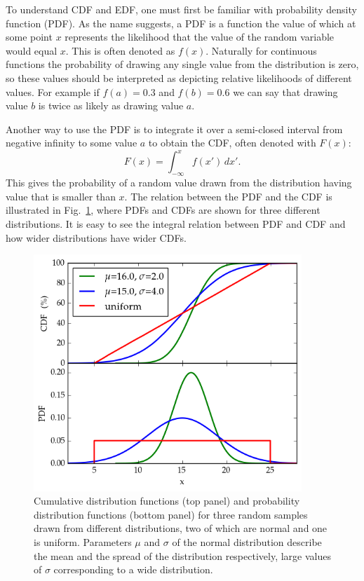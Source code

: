 \documentclass[english, oneside]{HYgradu}
\begin{document}
To understand CDF and EDF, one must first be familiar with probability density function (PDF).
As the name suggests, a PDF is a function the value of which at some point $x$ represents the likelihood that the value of the random variable would equal $x$. This is often denoted as $f(x)$. Naturally for continuous functions the probability of drawing any single value from the distribution is zero, so these values should be interpreted as depicting relative likelihoods of different values. For example if $f(a)=0.3$ and $f(b)=0.6$ we can say that drawing value $b$ is twice as likely as drawing value $a$. \citep{htk}

Another way to use the PDF is to integrate it over a semi-closed interval from negative infinity to some value $a$ to obtain the CDF, often denoted with $F(x)$:
\begin{equation}
	F(x) = \int_{-\infty}^x f(x') \,dx'.
\end{equation}	
This gives the probability of a random value drawn from the distribution having value that is smaller than $x$. The relation between the PDF and the CDF is illustrated in Fig.\ \ref{fig:cdf}, where PDFs and CDFs are shown for three different distributions. It is easy to see the integral relation between PDF and CDF and how wider distributions have wider CDFs. \citep{htk}

\begin{figure}
   \centering
   \includegraphics[width=0.9\textwidth]{kuvat/cdf.png}
   \caption{Cumulative distribution functions (top panel) and probability distribution functions (bottom panel) for three random samples drawn from different distributions, two of which are normal and one is uniform. Parameters $\mu$ and $\sigma$ of the normal distribution describe the mean and the spread of the distribution respectively, large values of $\sigma$ corresponding to a wide distribution.}
   \label{fig:cdf}

\end{figure}
\end{document}
